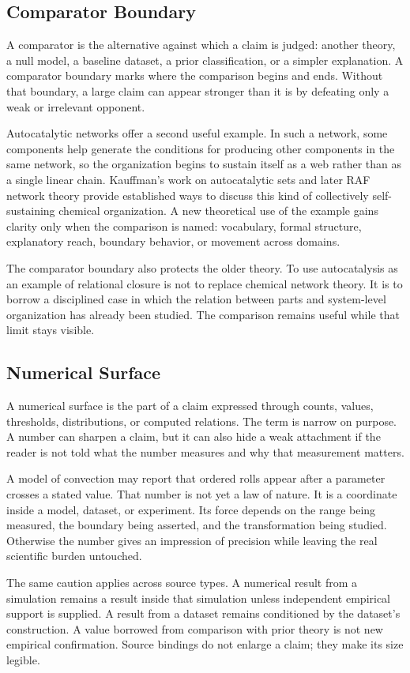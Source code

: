 \documentclass[11pt,a4paper,openany]{book}
\begin{document}
\subsection{Comparator Boundary}
A comparator is the alternative against which a claim is judged: another theory, a null model, a baseline dataset, a prior classification, or a simpler explanation. A comparator boundary marks where the comparison begins and ends. Without that boundary, a large claim can appear stronger than it is by defeating only a weak or irrelevant opponent. \cite{haken_synergetics,nicolis_prigogine_selforg}\par
Autocatalytic networks offer a second useful example. In such a network, some components help generate the conditions for producing other components in the same network, so the organization begins to sustain itself as a web rather than as a single linear chain. Kauffman's work on autocatalytic sets and later RAF network theory provide established ways to discuss this kind of collectively self-sustaining chemical organization. A new theoretical use of the example gains clarity only when the comparison is named: vocabulary, formal structure, explanatory reach, boundary behavior, or movement across domains.\par
The comparator boundary also protects the older theory. To use autocatalysis as an example of relational closure is not to replace chemical network theory. It is to borrow a disciplined case in which the relation between parts and system-level organization has already been studied. The comparison remains useful while that limit stays visible.\par
\subsection{Numerical Surface}
A numerical surface is the part of a claim expressed through counts, values, thresholds, distributions, or computed relations. The term is narrow on purpose. A number can sharpen a claim, but it can also hide a weak attachment if the reader is not told what the number measures and why that measurement matters. \cite{haken_synergetics,nicolis_prigogine_selforg}\par
A model of convection may report that ordered rolls appear after a parameter crosses a stated value. That number is not yet a law of nature. It is a coordinate inside a model, dataset, or experiment. Its force depends on the range being measured, the boundary being asserted, and the transformation being studied. Otherwise the number gives an impression of precision while leaving the real scientific burden untouched.\par
The same caution applies across source types. A numerical result from a simulation remains a result inside that simulation unless independent empirical support is supplied. A result from a dataset remains conditioned by the dataset's construction. A value borrowed from comparison with prior theory is not new empirical confirmation. Source bindings do not enlarge a claim; they make its size legible.\par
\end{document}
